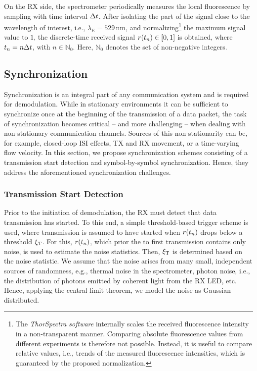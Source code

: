 %
On the \ac{RX} side, the spectrometer periodically measures the local fluorescence by sampling with time interval $\Delta t$. After isolating the part of the signal close to the wavelength of interest, i.e., $\lambda_\mathrm{E} = 529 \, \si{\nm}$, and normalizing\footnote{The \textit{ThorSpectra software} internally scales the received fluorescence intensity in a non-transparent manner. Comparing absolute fluorescence values from different experiments is therefore not possible. Instead, it is useful to compare relative values, i.e., trends of the measured fluorescence intensities, which is guaranteed by the proposed normalization.} the maximum signal value to $1$, the discrete-time received signal $r(t_n) \in [0,1]$ is obtained, where $t_n = n\Delta t$, with $n \in \mathbb{N}_0$. Here, $\mathbb{N}_0$ denotes the set of non-negative integers.
%
\scaleSubsection
\subsection{Synchronization}\label{subsec:sync}
\scaleSubsectionBelow
%
Synchronization is an integral part of any communication system and is required for demodulation. While in stationary environments it can be sufficient to synchronize once at the beginning of the transmission of a data packet, the task of synchronization becomes critical -- and more challenging -- when dealing with non-stationary communication channels. Sources of this non-stationarity can be, for example, closed-loop \ac{ISI} effects, \ac{TX} and \ac{RX} movement, or a time-varying flow velocity. In this section, we propose synchronization schemes consisting of a transmission start detection and symbol-by-symbol synchronization. Hence, they address the aforementioned synchronization challenges.
%
\scaleSubsubsection
\subsubsection{Transmission Start Detection}\label{subsec:transmission}
\scaleSubsubsectionBelow
%
Prior to the initiation of demodulation, the \ac{RX} must detect that data transmission has started. To this end, a simple threshold-based trigger scheme is used, where transmission is assumed to have started when $r(t_n)$ drops below a threshold $\xi_\mathrm{T}$. For this, $r(t_n)$, which prior the to first transmission contains only noise, is used to estimate the noise statistics. Then, $\xi_\mathrm{T}$ is determined based on the noise statistic. We assume that the noise arises from many small, independent sources of randomness, e.g., thermal noise in the spectrometer, photon noise, i.e., the distribution of photons emitted by coherent light \cite{mandel1959fluctuations} from the \ac{RX} \ac{LED}, etc. Hence, applying the central limit theorem, we model the noise as Gaussian distributed.

